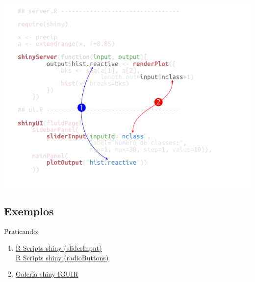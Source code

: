 \begin{frame}
\includegraphics[scale=0.9]{./tikz/hist_slider_shiny-2.pdf}
\end{frame}


\subsection*{Exemplos}

\begin{frame}
 Praticando:
  \begin{enumerate}
  \item
    \href{run:./R/shiny/shiny}{R Scripts shiny (sliderInput)}\\
    \href{run:./R/shiny/shiny2}{R Scripts shiny (radioButtons)}
  \item 
	\href{http://200.17.213.89:3838/iguir/list/}{Galeria shiny IGUIR}
  \end{enumerate}
\end{frame}


